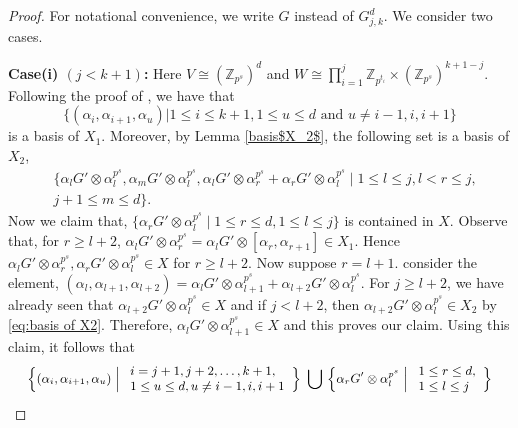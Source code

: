 \documentclass[preprint,sort&compress,12pt]{elsarticle}
\numberwithin{equation}{section}
\theoremstyle{definition}
\newcommand{\Z}{\mathbb{Z}}
\begin{document}
\begin{proof}
For notational convenience, we write $G$ instead of $G_{j,k}^d$. We consider two cases.

\textbf{Case(i) $(j < k+1)$:}
Here $V \cong (\Z_{p^s})^d$ and $W \cong \prod_{i=1}^{j}\Z_{p^{t_i}}  \times (\Z_{p^s})^{k+1-j}.$ 
Following the proof of \cite[Proposition 10]{Rai2023}, we have that
$$\{(\alpha_i,\alpha_{i+1},\alpha_u)| 1\le i \le k+1,1\le  u\le d \text{ and } u \neq i-1,i,i+1\}$$
is a basis of $X_1$. Moreover, by Lemma \ref{basis$X_2$}, the following set is a basis of $X_2$,
\begin{equation}\label{eq:basis of X2}
    \begin{aligned}
    & \{\alpha_ l G' \otimes \alpha_l^{p^s},\alpha_mG' \otimes \alpha_l^{p^s},\alpha_ l G' \otimes \alpha_r^{p^s}+\alpha_ r G' \otimes \alpha_l^{p^s} \mid 1 \le l \le j,l <r \le j,\\
  & j+1 \le m \le d\}. 
\end{aligned}
\end{equation}
Now we claim that, $\{\alpha_ r G' \otimes \alpha_l^{p^s} \mid 1 \le r \le d, 1\le l \le j\} $ is contained in $ X$. Observe that, for $r \ge l+2$, $\alpha_l G' \otimes \alpha_r^{p^s}=\alpha_l G' \otimes [\alpha_r,\alpha_{r+1}] \in X_1.$ Hence $\alpha_ l G' \otimes \alpha_r^{p^s},\alpha_ r G' \otimes \alpha_l^{p^s} \in X$ for $r \ge l+2$. Now suppose $r=l+1$. consider the element,
$(\alpha_l ,\alpha_{l+1},\alpha_{l+2})=\alpha_ l G' \otimes \alpha_{l+1}^{p^s}+\alpha_{l+2} G' \otimes \alpha_l^{p^s}$.
For $j \ge l+2$, we have already seen that $\alpha_ {l+2} G' \otimes \alpha_{l}^{p^s} \in X$ and if $j < l+2$, then $\alpha_ {l+2} G' \otimes \alpha_{l}^{p^s} \in X_2$ by \eqref{eq:basis of X2}. Therefore, $\alpha_ l G' \otimes \alpha_{l+1}^{p^s} \in X$ and this proves our claim. Using this claim, it follows that 
\begin{equation*}
\small
\begin{array}{cl}
\Bigl\{
(\alpha_i,\alpha_{i+1},\alpha_u)
\;\Big|\;
\begin{array}{l}
i = j+1, j+2, \ldots, k+1,\\
1\le u \le d,
u \neq i-1,i,i+1
\end{array}
\Bigr\}
\displaystyle
 \ \bigcup \ 
\Bigl\{
\alpha_r G' \otimes \alpha_l^{p^s}
\;\Big|\;
\begin{array}{l}
1 \le r \le d,\\
1 \le l \le j
\end{array}
\Bigr\}
\end{array}

\end{equation*}
\end{proof}
\end{document}
